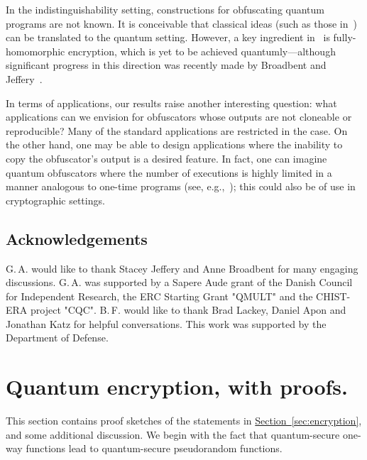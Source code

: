 \documentclass[envcountsame]{llncs}
\numberwithin{equation}{section}
\newcommand{\expref}[2]{\texorpdfstring{\hyperref[#2]{#1~\ref{#2}}}{#1~\ref{#2}}}
\begin{document}
In the indistinguishability setting, constructions for obfuscating quantum programs are not known. It is conceivable that classical ideas (such as those in~\cite{GGHRSW13}) can be translated to the quantum setting. However, a key ingredient in~\cite{GGHRSW13} is fully-homomorphic encryption, which is yet to be achieved quantumly---although significant progress in this direction was recently made by Broadbent and Jeffery~\cite{BJ15}.

In terms of applications, our results raise another interesting question: what applications can we envision for obfuscators whose outputs are not cloneable or reproducible? Many of the standard applications are restricted in the case. On the other hand, one may be able to design applications where the inability to copy the obfuscator's output is a desired feature. In fact, one can imagine quantum obfuscators where the number of executions is highly limited in a manner analogous to one-time programs (see, e.g.,~\cite{BDG13}); this could also be of use in cryptographic settings.

\subsection*{Acknowledgements}

G.\,A. would like to thank Stacey Jeffery and Anne Broadbent for many engaging discussions. G.\,A. was supported by a Sapere Aude grant of the Danish Council for Independent Research, the ERC Starting Grant "QMULT" and the CHIST-ERA project "CQC". B.\,F. would like to thank Brad Lackey, Daniel Apon and Jonathan Katz for helpful conversations.  This work was supported by the Department of Defense.  



\newpage

\appendix

\section{Quantum encryption, with proofs.}\label{sec:appendix}

This section contains proof sketches of the statements in \expref{Section}{sec:encryption}, and some additional discussion. We begin with the fact that quantum-secure one-way functions lead to quantum-secure pseudorandom functions.
\end{document}
